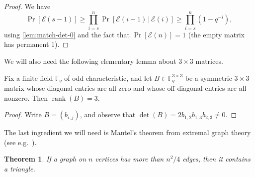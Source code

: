 \documentclass[10pt,reqno]{amsart}
\numberwithin{equation}{section}
\newtheorem{theorem}{Theorem}[section]
\theoremstyle{remark}
\newcommand{\mb}{\mathbb}
\newcommand{\on}{\operatorname}
\begin{document}
\begin{proof}
We have
\[
\Pr[\mathcal{E}(s-1)]\ge \prod_{i=s}^{n}\Pr[\mathcal{E}(i-1)\,|\,\mathcal{E}(i)]\ge\prod_{i=s}^{n}(1-q^{-i}),
\]
using \cref{lem:match-det-0} and the fact that $\Pr[\mathcal{E}(n)]=1$
(the empty matrix has permanent 1).
\end{proof}




We will also need the following elementary
lemma about $3\times3$ matrices.
\begin{lemma}
\label{lem:matrix}Fix a finite field $\mathbb{F}_{q}$ of odd characteristic,
and let $B\in\mathbb{F}_{q}^{3\times3}$ be a symmetric $3\times3$
matrix whose diagonal entries are all zero and whose off-diagonal
entries are all nonzero. Then $\on{rank}(B)=3$.
\end{lemma}
\begin{proof}
Write $B=(b_{i,j})$, and observe that $\det(B)=2b_{1,2}b_{1,3}b_{2,3}\ne0$.
\end{proof}
The last ingredient we will need is Mantel's theorem from extremal graph theory (see e.g.\ \cite[Theorem~4.6]{Juk01}).
\begin{theorem}\label{thm:mantel}
    If a graph on $n$ vertices has more than $n^2/4$ edges, then it contains a triangle.
\end{theorem}
\end{document}
